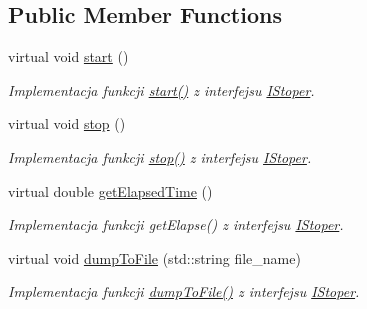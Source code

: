 \subsection*{Public Member Functions}
\begin{DoxyCompactItemize}
\item 
virtual void \hyperlink{class_stoper_ae9dc93f4113f2d3afbe3b67166a7615d}{start} ()
\begin{DoxyCompactList}\small\item\em Implementacja funkcji \hyperlink{class_stoper_ae9dc93f4113f2d3afbe3b67166a7615d}{start()} z interfejsu \hyperlink{class_i_stoper}{I\-Stoper}. \end{DoxyCompactList}\item 
virtual void \hyperlink{class_stoper_afa91decbc99ba7509f1129f77c03b443}{stop} ()
\begin{DoxyCompactList}\small\item\em Implementacja funkcji \hyperlink{class_stoper_afa91decbc99ba7509f1129f77c03b443}{stop()} z interfejsu \hyperlink{class_i_stoper}{I\-Stoper}. \end{DoxyCompactList}\item 
virtual double \hyperlink{class_stoper_a8f50bbba9cb719ca9d573a5cb4a19e36}{get\-Elapsed\-Time} ()
\begin{DoxyCompactList}\small\item\em Implementacja funkcji get\-Elapse() z interfejsu \hyperlink{class_i_stoper}{I\-Stoper}. \end{DoxyCompactList}\item 
virtual void \hyperlink{class_stoper_a8896c3b2fa5428e29e5fef7f7bad3615}{dump\-To\-File} (std\-::string file\-\_\-name)
\begin{DoxyCompactList}\small\item\em Implementacja funkcji \hyperlink{class_stoper_a8896c3b2fa5428e29e5fef7f7bad3615}{dump\-To\-File()} z interfejsu \hyperlink{class_i_stoper}{I\-Stoper}. \end{DoxyCompactList}\end{DoxyCompactItemize}

